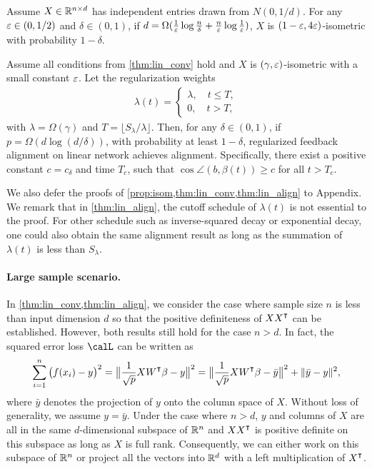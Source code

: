 \begin{proposition}
\label{prop:isom}
Assume $X\in\mathbb{R}^{n\times d}$ has independent entries drawn from $N(0,1/d)$. For any $\varepsilon \in (0,1/2)$ and $\delta \in (0,1)$, if $d=\Omega(\frac{1}{\varepsilon}\log\frac{n}{\delta}+\frac{n}{\varepsilon}\log \frac{1}{\varepsilon})$, $X$ is $(1-\varepsilon, 4\varepsilon)$-isometric with probability $1-\delta$.
\end{proposition}

\begin{theorem}
\label{thm:lin_align}
Assume all conditions from \cref{thm:lin_conv} hold and $X$ is $(\gamma, \varepsilon)$-isometric with a small constant $\varepsilon$. Let the regularization weights
\begin{align*}
\lambda(t) = 
\begin{cases}
    \lambda, \quad t\leq T,\\
    0, \quad t > T,
\end{cases}
\end{align*}
with $\lambda=\Omega(\gamma)$ and $T = \lfloor S_\lambda/\lambda\rfloor$. Then, for any $\delta\in(0,1)$, if $p = \Omega(d\log(d/\delta))$, with probability at least $1-\delta$, regularized feedback alignment on linear network achieves alignment. Specifically, there exist a positive constant $c=c_\delta$ and time $T_c$, such that $\cos\angle(b, \beta(t))\geq c$ for all $t>T_c$.
\end{theorem}

We also defer the proofs of \cref{prop:isom,thm:lin_conv,thm:lin_align} to Appendix. We remark that in \cref{thm:lin_align}, the cutoff schedule of $\lambda(t)$ is not essential to the proof. For other schedule such as inverse-squared decay or exponential decay, one could also obtain the same alignment result as long as the summation of $\lambda(t)$ is less than $S_\lambda$.

\paragraph{Large sample scenario.} In \cref{thm:lin_conv,thm:lin_align}, we consider the case where sample size $n$ is less than input dimension $d$ so that the positive definiteness of $XX\transpose$ can be established. However, both results still hold for the case $n>d$. In fact, the squared error loss $\calL$ can be written as
\begin{equation*}
\sum_{i=1}^n\big(f(x_i)-y\big)^2 = \big\|\frac{1}{\sqrt{p}}XW\transpose\beta-y\big\|^2 = \big\|\frac{1}{\sqrt{p}}XW\transpose\beta-\bar{y}\big\|^2+ \|\bar{y}-y\|^2,
\end{equation*}
where $\bar{y}$ denotes the projection of $y$ onto the column space of $X$. Without loss of generality, we assume $y=\bar{y}$. Under the case where $n>d$, $y$ and columns of $X$ are all in the same $d$-dimensional subspace of ${\mathbb{R}^n}$ and $XX\transpose$ is positive definite on this subspace as long as $X$ is full rank. Consequently, we can either work on this subspace of ${\mathbb{R}^n}$ or project all the vectors into ${\mathbb{R}^{d}}$ with a left multiplication of $X\transpose$.



